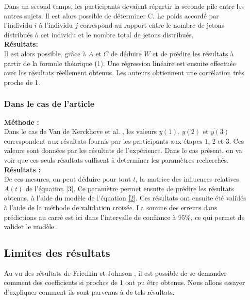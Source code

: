 \documentclass{scrreprt}
\begin{document}
\begin{multicols}{2}
Dans un second temps, les participants devaient répartir la seconde pile entre les autres sujets. Il est alors possible de déterminer C. Le poids accordé par l'individu $i$ à l'individu $j$ correspond au rapport entre le nombre de jetons distribués à cet individu et le nombre total de jetons distribués.\\

\textbf{Résultats:}\\

Il est alors possible, grâce à $A$ et $C$ de déduire $W$ et de prédire les résultats à partir de la formule théorique (1). Une régression linéaire est ensuite effectuée avec les résultats réellement obtenus. Les auteurs obtiennent une corrélation très proche de 1.
 
\subsubsection{Dans le cas de l'article \cite{VMG}}

\textbf{Méthode :} \\

Dans le cas de Van de Kerckhove et al. \cite{VMG}, les valeurs $y(1)$, $y(2)$ et $y(3)$ correspondent aux résultats fournis par les participants aux étapes $1$, $2$ et $3$. Ces valeurs sont données par les résultats de l'expérience. Dans le cas présent, on va voir que ces seuls résultats suffisent à determiner les paramètres recherchés.\\

\textbf{Résultats :} \\

De ces mesures, on peut déduire pour tout $t$, la matrice des influences relatives $A(t)$ de l'équation \eqref{3}. Ce paramètre permet ensuite de prédire les résultats obtenus, à l'aide du modèle de l'équation \eqref{2}. Ces résultats ont ensuite été validés à l'aide de la méthode de validation croisée. La somme des erreurs dans prédictions au carré est ici dans l'intervalle de confiance à $95\%$, ce qui permet de valider le modèle.\\

\subsection{Limites des résultats}

Au vu des résultats de Friedkin et Johnson \cite{FJ}, il est possible de se demander comment des coefficients si proches de 1 ont pu être obtenus. Nous allons essayer d'expliquer comment ils sont parvenus à de tels résultats.\\


\end{multicols}
\end{document}
